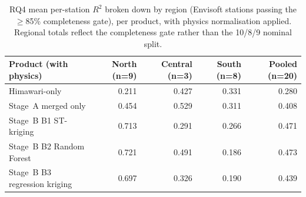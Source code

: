 \begin{table}[H]
\centering
\caption{RQ4 mean per-station $R^{2}$ broken down by region (Envisoft stations passing the $\geq$85\% completeness gate), per product, with physics normalisation applied. Regional totals reflect the completeness gate rather than the 10/8/9 nominal split.}
\label{tab:res-rq4-regional}
\small
\begin{tabular}{lrrrr}
\hline
\textbf{Product (with physics)} & \textbf{North (n=9)} & \textbf{Central (n=3)} & \textbf{South (n=8)} & \textbf{Pooled (n=20)} \\
\hline
Himawari-only & 0.211 & 0.427 & 0.331 & 0.280 \\
Stage~A merged only & 0.454 & 0.529 & 0.311 & 0.408 \\
Stage~B B1 ST-kriging & 0.713 & 0.291 & 0.266 & 0.471 \\
Stage~B B2 Random Forest & 0.721 & 0.491 & 0.186 & 0.473 \\
Stage~B B3 regression kriging & 0.697 & 0.326 & 0.190 & 0.439 \\
\hline
\end{tabular}
\end{table}